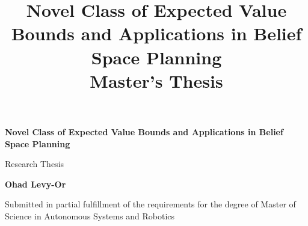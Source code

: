 \title{Novel Class of Expected Value Bounds and Applications in Belief Space Planning \\ \large{Master's Thesis}}


\begin{titlepage}
	\begin{center}
		\vspace*{1cm}

		\textbf{Novel Class of Expected Value Bounds and Applications in Belief Space Planning }

		\vspace{0.5cm}
		Research Thesis

		\vspace{1.5cm}

		\textbf{Ohad Levy-Or}

		\vfill

		Submitted in partial fulfillment of the requirements for the degree of Master of Science in Autonomous Systems and Robotics

		\vspace{0.8cm}



	\end{center}
\end{titlepage}
